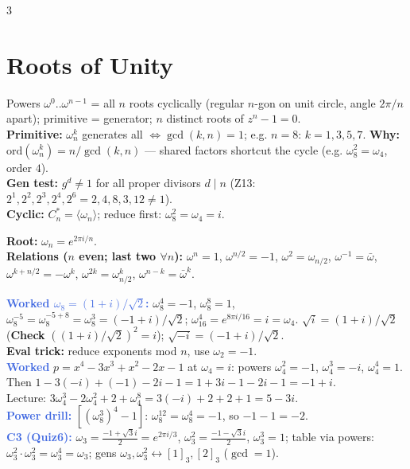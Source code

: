 \documentclass[9pt]{extarticle}
\newcommand{\hl}[1]{\textbf{\textcolor{BrickRed}{#1}}}
\newcommand{\wk}[1]{\textbf{\textcolor{OliveGreen}{#1}}}
\newcommand{\ex}[1]{\textbf{\textcolor{RoyalBlue}{#1}}}
\begin{document}
\begin{multicols}{3}
\section{Roots of Unity}
\begin{sloppypar}\raggedright
Powers $\omega^0..\omega^{n-1}$ = all $n$ roots cyclically (regular $n$-gon on unit circle, angle $2\pi/n$ apart); primitive = generator; $n$ distinct roots of $z^n{-}1{=}0$.\\
\hl{Primitive:} $\omega_n^k$ generates all $\iff\gcd(k,n){=}1$; e.g. $n{=}8$: $k{=}1,3,5,7$. \wk{Why:} $\mathrm{ord}(\omega_n^k){=}n/\gcd(k,n)$ — shared factors shortcut the cycle (e.g. $\omega_8^2{=}\omega_4$, order $4$).\\
\wk{Gen test:} $g^d{\ne}1$ for all proper divisors $d{\mid}n$ (Z13: $2^1,2^2,2^3,2^4,2^6{=}2,4,8,3,12{\ne}1$).\\
\hl{Cyclic:} $C_n^*{=}\langle\omega_n\rangle$; reduce first: $\omega_8^2{=}\omega_4{=}i$.
\end{sloppypar}
\begin{kbox}\raggedright
\textbf{Root:} \hl{$\omega_n{=}e^{2\pi i/n}$}.\\
\textbf{Relations ($n$ even; last two $\forall n$):} $\omega^n{=}1$, $\omega^{n/2}{=}{-}1$, $\omega^2{=}\omega_{n/2}$, $\omega^{-1}{=}\bar\omega$, $\omega^{k+n/2}{=}{-}\omega^k$, $\omega^{2k}{=}\omega_{n/2}^k$, $\omega^{n-k}{=}\bar\omega^k$.
\end{kbox}
\begin{sloppypar}\raggedright
\ex{Worked $\omega_8{=}(1{+}i)/\sqrt2$:} $\omega_8^4{=}{-}1$, $\omega_8^8{=}1$, $\omega_8^{-5}{=}\omega_8^{-5+8}{=}\omega_8^3{=}({-}1{+}i)/\sqrt2$; $\omega_{16}^4{=}e^{8\pi i/16}{=}i{=}\omega_4$. $\sqrt{i}{=}(1{+}i)/\sqrt2$ (\wk{Check} $((1{+}i)/\sqrt2)^2{=}i$); $\sqrt{-i}{=}({-}1{+}i)/\sqrt2$.\\
\wk{Eval trick:} reduce exponents mod $n$, use $\omega_2{=}{-}1$.\\
\ex{Worked} $p{=}x^4{-}3x^3{+}x^2{-}2x{-}1$ at $\omega_4{=}i$: powers $\omega_4^2{=}{-}1$, $\omega_4^3{=}{-}i$, $\omega_4^4{=}1$.\\
Then $1{-}3({-}i){+}({-}1){-}2i{-}1{=}1{+}3i{-}1{-}2i{-}1{=}{-}1{+}i$.\\
Lecture: $3\omega_4^3{-}2\omega_4^2{+}2{+}\omega_4^8{=}3({-}i){+}2{+}2{+}1{=}5{-}3i$.\\
\ex{Power drill:} $[(\omega_8^3)^4{-}1]$: $\omega_8^{12}{=}\omega_8^4{=}{-}1$, so ${-}1{-}1{=}{-}2$.\\
\ex{C3 (Quiz6):} $\omega_3{=}\frac{-1{+}\sqrt3 i}{2}{=}e^{2\pi i/3}$, $\omega_3^2{=}\frac{-1{-}\sqrt3 i}{2}$, $\omega_3^3{=}1$; table via powers: $\omega_3^2{\cdot}\omega_3^2{=}\omega_3^4{=}\omega_3$; gens $\omega_3,\omega_3^2{\leftrightarrow}[1]_3,[2]_3$ ($\gcd{=}1$).
\end{sloppypar}


\end{multicols}
\end{document}
